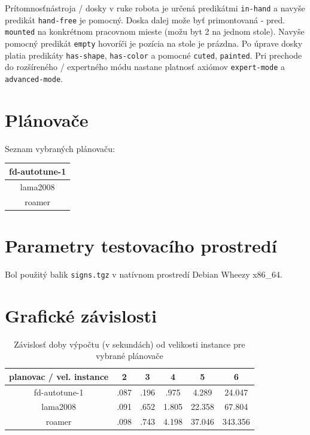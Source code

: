 \documentclass[a4paper,journal]{IEEEtran}
\begin{document}
Pr\'itomnos\v tn\'astroja / dosky v ruke robota je ur\v cen\'a  
predik\'atmi \texttt{in-hand}
a navy\v se  predik\'at \texttt{hand-free}
je pomocn\'y. Doska dalej mo\v ze by\v t primontovan\'a  - pred. \texttt{mounted} na konkr\'etnom pracovnom mieste
(mo\v zu byt 2 na jednom stole). Navy\v se pomocn\'y predik\'at \texttt{empty} hovor\'i\v ci je poz\'icia na stole je 
pr\'azdna. Po \'uprave dosky platia predik\'aty  \texttt{has-shape}, \texttt{has-color} a pomocn\'e
 \texttt{cuted},  \texttt{painted}. 
 Pri prechode do roz\v s\'iren\'eho / expertn\'eho m\'odu nastane platnos\v t axi\'omov \texttt{expert-mode} a 
 \texttt{advanced-mode}. 

\section{Pl\'anova\v ce}
Seznam vybran\'ych pl\'anova\v cu:
\begin{table}[!h]
\begin{center}
\begin{tabular}{|c|}\hline
fd-autotune-1 \\ \hline
lama2008 \\ \hline
roamer \\ \hline
\end{tabular}
\end{center}
\end{table} 

\section{Parametry testovac\'iho prostred\'i }
Bol pou\v zit\' y balik \texttt{signs.tgz} v nat\'ivnom prostred\'i Debian Wheezy x86\_64.



\section{Grafick\'e z\'avislosti}


\begin{table}[!h]
  \label{tbl:speed}
\caption{Z\'avislos\v t doby v\'ypo\v ctu (v sekund\'ach) od velikosti instance pre vybran\'e pl\'anova\v ce}
\begin{center}
\begin{tabular}{|c|c|c|c|c|c|}\hline
\textbf{planovac} / \textbf{vel. instance} & 2 & 3 & 4 & 5 & 6 \\ \hline
fd-autotune-1 & .087 & .196 & .975 & 4.289 & 24.047 \\ \hline
lama2008 & .091 & .652 & 1.805 & 22.358 & 67.804 \\ \hline
roamer & .098 & .743 & 4.198 & 37.046 & 343.356 \\ \hline
\end{tabular}
\end{center}
\end{table}
\end{document}
